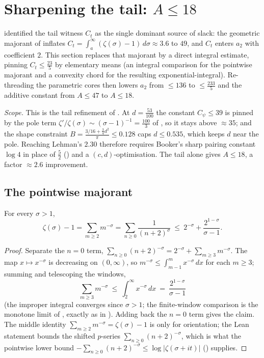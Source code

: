 \section{Sharpening the tail: \texorpdfstring{$A\le 18$}{A ≤ 18}}
\label{sec:le_tail_sharp}

 identified the tail witness $C_t$ as the single dominant source of
slack: the geometric majorant of  inflates
$C_t=\int_a^\infty(\zeta(\sigma)-1)\,d\sigma\approx3.6$ to $49$, and $C_t$ enters $a_2$
with coefficient $2$. This section replaces that majorant by a direct
integral estimate, pinning $C_t\le\tfrac{23}{5}$ by elementary means (an integral
comparison for the pointwise majorant and a convexity chord for the resulting
exponential-integral). Re-threading the parametric cores then lowers $a_2$ from
$\le136$ to $\le\tfrac{233}5$ and the additive constant from $A\le47$ to $A\le18$.

\medskip
\emph{Scope.} This is the tail refinement of . At $d=\tfrac{53}{100}$
the constant $C_\psi\le39$ is pinned by the pole term $\zeta'/\zeta(\sigma)\sim(\sigma-1)^{-1}=\tfrac{100}3$
of , so it stays above $\approx35$; and the shape
constraint $B=\tfrac{3/16+\frac34 d^2}{\pi}\le0.128$ caps $d\le0.535$, which keeps $d$ near
the pole. Reaching Lehman's $2.30$ therefore requires Booker's sharp pairing constant
$\log4$ in place of $\tfrac52$ () and a $(c,d)$-optimisation. The tail
alone gives $A\le18$, a factor $\approx2.6$ improvement.

\subsection{The pointwise majorant}

\begin{lemma}
\label{lem:le_tail_majorant}
\leanok
For every $\sigma>1$,
\[
  \zeta(\sigma)-1=\sum_{m\ge2}m^{-\sigma}=\sum_{n\ge0}\frac1{(n+2)^{\sigma}}
    \ \le\ 2^{-\sigma}+\frac{2^{1-\sigma}}{\sigma-1}.
\]
\end{lemma}

\begin{proof}
\leanok
Separate the $n=0$ term, $\sum_{n\ge0}(n+2)^{-\sigma}=2^{-\sigma}+\sum_{m\ge3}m^{-\sigma}$.
The map $x\mapsto x^{-\sigma}$ is decreasing on $(0,\infty)$, so $m^{-\sigma}\le\int_{m-1}^{m}x^{-\sigma}\,dx$
for each $m\ge3$; summing and telescoping the windows,
\[
  \sum_{m\ge3}m^{-\sigma}\ \le\ \int_2^\infty x^{-\sigma}\,dx
     \ =\ \frac{2^{1-\sigma}}{\sigma-1}
\]
(the improper integral converges since $\sigma>1$; the finite-window comparison is the
monotone limit of , exactly as in
). Adding back the $n=0$ term gives the claim. The middle
identity $\sum_{m\ge2}m^{-\sigma}=\zeta(\sigma)-1$ is only for orientation; the Lean
statement bounds the shifted $p$-series $\sum_{n\ge0}(n+2)^{-\sigma}$, which is what the
pointwise lower bound
$-\!\sum_{n\ge0}(n+2)^{-\sigma}\le\log|\zeta(\sigma+it)|$
() supplies.
\end{proof}

